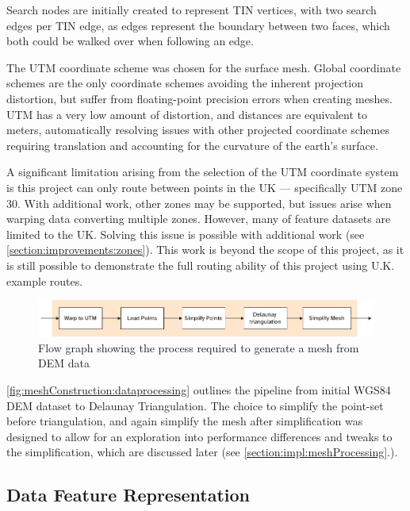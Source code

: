 \documentclass[12pt]{article}
\begin{document}
Search nodes are initially created to represent TIN vertices, with two search edges per TIN edge, as edges represent the boundary between two faces, which both could be walked over when following an edge.

The UTM coordinate scheme was chosen for the surface mesh. Global coordinate schemes are the only coordinate schemes avoiding the inherent projection distortion, but suffer from floating-point precision errors when creating meshes. UTM has a very low amount of distortion, and distances are equivalent to meters, automatically resolving issues with other projected coordinate schemes requiring translation and accounting for the curvature of the earth's surface.

A significant limitation arising from the selection of the UTM coordinate system is this project can only route between points in the UK --- specifically UTM zone 30. With additional work, other zones may be supported, but issues arise when warping data converting multiple zones. However, many of feature datasets are limited to the UK. Solving this issue is possible with additional work (see \autoref{section:improvements:zones}). This work is beyond the scope of this project, as it is still possible to demonstrate the full routing ability of this project using U.K. example routes.

\begin{figure}[H]
  \centering
  \includegraphics[width=1\textwidth]{assets/meshConstruction-zoomed.png}
  \caption{Flow graph showing the process required to generate a mesh from DEM data}\label{fig:meshConstruction:dataprocessing}
\end{figure}

\autoref{fig:meshConstruction:dataprocessing} outlines the pipeline from initial WGS84 DEM dataset to Delaunay Triangulation. The choice to simplify the point-set before triangulation, and again simplify the mesh after simplification was designed to allow for an exploration into performance differences and tweaks to the simplification, which are discussed later (see \autoref{section:impl:meshProcessing}.).

\subsection{Data Feature Representation}\label{section:design:mesh:dataFeatures}
\end{document}
